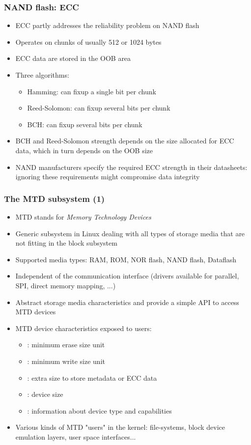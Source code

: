 \begin{frame}
  \frametitle{NAND flash: ECC}
  \begin{itemize}
  \item ECC partly addresses the reliability problem on NAND flash
  \item Operates on chunks of usually 512 or 1024 bytes
  \item ECC data are stored in the OOB area
  \item Three algorithms:
    \begin{itemize}
    \item Hamming: can fixup a single bit per chunk
    \item Reed-Solomon: can fixup several bits per chunk
    \item BCH: can fixup several bits per chunk
    \end{itemize}
  \item BCH and Reed-Solomon strength depends on the size allocated
    for ECC data, which in turn depends on the OOB size
  \item NAND manufacturers specify the required ECC strength in their
    datasheets: ignoring these requirements might compromise data
    integrity
  \end{itemize}
\end{frame}

\begin{frame}
  \frametitle{The MTD subsystem (1)}
  \begin{itemize}
  \item MTD stands for {\em Memory Technology Devices}
  \item Generic subsystem in Linux dealing with all types of storage media that
    are not fitting in the block subsystem
  \item Supported media types: RAM, ROM, NOR flash, NAND flash,
    Dataflash
  \item Independent of the communication interface (drivers available
    for parallel, SPI, direct memory mapping, ...)
  \item Abstract storage media characteristics and provide a simple
    API to access MTD devices
  \item MTD device characteristics exposed to users:
    \begin{itemize}
    \item {}: minimum erase size unit
    \item {}: minimum write size unit
    \item {}: extra size to store metadata or ECC data
    \item {}: device size
    \item {}: information about device type and capabilities
    \end{itemize}
  \item Various kinds of MTD "users" in the kernel: file-systems, block
    device emulation layers, user space interfaces...
  \end{itemize}
\end{frame}

